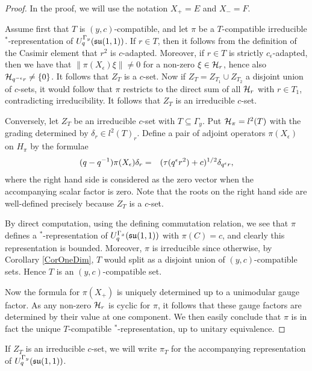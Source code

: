 \begin{proof} In the proof, we will use the notation $X_+ = E$ and $X_- = F$.

Assume first that $T$ is $(y,c)$-compatible, and let $\pi$ be a $T$-compatible irreducible $^*$-representation of $U_q^{\Gamma_y}(\mathfrak{su}(1,1))$. If $r\in T$, then it follows from the definition of the Casimir element that $r^2$ is $c$-adapted. Moreover, if $r\in T$ is strictly $c_{\epsilon}$-adapted, then we have that $\|\pi(X_{\epsilon})\xi\|\neq 0$ for a non-zero $\xi\in \mathcal{H}_r$, hence also $\mathcal{H}_{q^{-\epsilon}r}\neq \{0\}$. It follows that $Z_T$ is a $c$-set. Now if $Z_T=Z_{T_1}\cup Z_{T_2}$ a disjoint union of $c$-sets, it would follow that $\pi$ restricts to the direct sum of all $\mathcal{H}_r$ with $r\in T_1$, contradicting irreducibility. It follows that $Z_T$ is an irreducible $c$-set.

Conversely, let $Z_T$ be an irreducible $c$-set with $T\subseteq \Gamma_y$. Put $\mathcal{H}_{\pi} = l^2(T)$ with the grading determined by $\delta_{r}\in l^2(T)_r$. Define a pair of adjoint operators $\pi(X_{\epsilon})$ on $H_{\pi}$ by the formulae \begin{eqnarray}\label{EqFormRepPlus} (q-q^{-1})\pi(X_{\epsilon})  \delta_{r} &=&  (\operatorname{\tau}(q^{\epsilon}r^2)+c)^{1/2}\delta_{q^{\epsilon}r},\end{eqnarray} where the right hand side is considered as the zero vector when the accompanying scalar factor is zero. Note that the roots on the right hand side are well-defined precisely because $Z_T$ is a $c$-set. 

By direct computation, using the defining commutation relation, we see that $\pi$ defines a $^*$-representation of $U_q^{\Gamma_x}(\mathfrak{su}(1,1))$ with $\pi(C) =c$, and clearly this representation is bounded. Moreover, $\pi$ is irreducible since otherwise, by Corollary \ref{CorOneDim}, $T$ would split as a disjoint union of $(y,c)$-compatible sets. Hence $T$ is an $(y,c)$-compatible set.

Now the formula for $\pi(X_+)$ is uniquely determined up to a unimodular gauge factor. As any non-zero $\mathcal{H}_r$ is cyclic for $\pi$, it follows that these gauge factors are determined by their value at one component. We then easily conclude that $\pi$ is in fact the unique $T$-compatible $^*$-representation, up to unitary equivalence.
\end{proof}

If $Z_T$ is an irreducible $c$-set, we will write $\pi_T$ for the accompanying representation of $U_q^{\Gamma_y}(\mathfrak{su}(1,1))$. 


